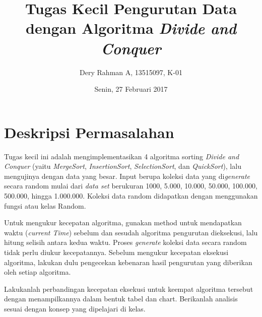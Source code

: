 \documentclass{article}
\title{Tugas Kecil Pengurutan Data dengan Algoritma \textit{Divide and Conquer}}
\author{Dery Rahman A, 13515097, K-01}
\date{Senin, 27 Februari 2017}
\begin{document}
	\maketitle

	\newpage

	\section{Deskripsi Permasalahan}
	\par Tugas kecil ini adalah mengimplementasikan 4 algoritma sorting \textit{Divide and Conquer} (yaitu \textit{MergeSort}, \textit{InsertionSort}, \textit{SelectionSort}, dan \textit{QuickSort}), lalu mengujinya dengan data yang besar. Input berupa koleksi data yang di\textit{generate} secara random mulai dari \textit{data set} berukuran 1000, 5.000, 10.000, 50.000, 100.000, 500.000, hingga 1.000.000. Koleksi data random didapatkan dengan menggunakan fungsi atau kelas Random. 
	\par Untuk mengukur kecepatan algoritma, gunakan method untuk mendapatkan waktu (\textit{current Time}) sebelum dan sesudah algoritma pengurutan dieksekusi, lalu hitung selisih antara kedua waktu. Proses \textit{generate} koleksi data secara random tidak perlu diukur kecepatannya. Sebelum mengukur kecepatan eksekusi algoritma, lakukan dulu pengecekan kebenaran hasil pengurutan yang diberikan oleh setiap algoritma.
	\par Lakukanlah perbandingan kecepatan eksekusi untuk keempat algoritma tersebut dengan menampilkannya dalam bentuk tabel dan chart. Berikanlah analisis sesuai dengan konsep yang dipelajari di kelas.
\end{document}
